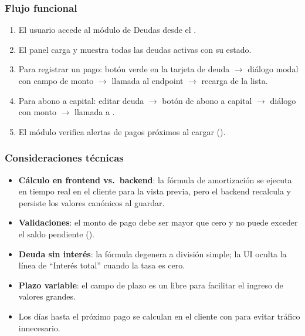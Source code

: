 \subsubsection{Flujo funcional}

\begin{enumerate}
  \item El usuario accede al módulo de Deudas desde el
        .
  \item El panel carga y muestra todas las deudas activas con su estado.
  \item Para registrar un pago: botón verde en la tarjeta de deuda
        $\to$ diálogo modal con campo de monto $\to$ llamada al endpoint
         $\to$ recarga de la lista.
  \item Para abono a capital: editar deuda $\to$ botón de abono a
        capital $\to$ diálogo con monto $\to$ llamada a
        .
  \item El módulo verifica alertas de pagos próximos al cargar
        ().
\end{enumerate}

\subsubsection{Consideraciones técnicas}

\begin{itemize}
  \item \textbf{Cálculo en frontend vs.\ backend}: la fórmula de
        amortización se ejecuta en tiempo real en el cliente para la
        vista previa, pero el backend recalcula y persiste los valores
        canónicos al guardar.
  \item \textbf{Validaciones}: el monto de pago debe ser mayor que cero
        y no puede exceder el saldo pendiente ().
  \item \textbf{Deuda sin interés}: la fórmula degenera a división
        simple; la UI oculta la línea de ``Interés total'' cuando la
        tasa es cero.
  \item \textbf{Plazo variable}: el campo de plazo es un
         libre para facilitar el ingreso de valores
        grandes.
  \item Los días hasta el próximo pago se calculan en el cliente con
         para evitar tráfico innecesario.
\end{itemize}


